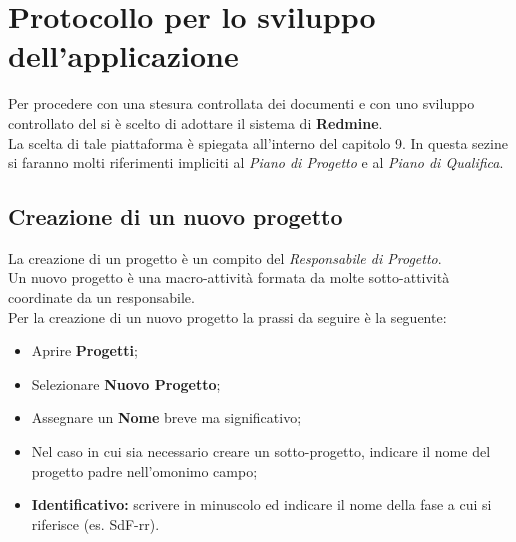 \section{Protocollo per lo sviluppo dell’applicazione}
  Per procedere con una stesura controllata dei documenti e con uno sviluppo controllato del  si è scelto di adottare
  il sistema di  \textbf{Redmine}.\\
  La scelta di tale piattaforma è spiegata all'interno del capitolo 9.
  In questa sezine si faranno molti riferimenti impliciti al \emph{Piano di Progetto} e al \emph{Piano di  Qualifica}.
  \subsection{Creazione di un nuovo progetto}
    La creazione di un progetto è un compito del \emph{Responsabile di Progetto}.\\
    Un nuovo progetto è una macro-attività formata da molte sotto-attività coordinate da un responsabile.\\
    Per la creazione di un nuovo progetto la prassi da seguire è la seguente:
    \begin{itemize}
      \item Aprire \textbf{Progetti};
      \item Selezionare \textbf{Nuovo Progetto};
      \item Assegnare un \textbf{Nome} breve ma significativo;
      \item Nel caso in cui sia necessario creare un sotto-progetto, indicare il nome del progetto padre nell'omonimo campo;
      \item \textbf{Identificativo: }scrivere in minuscolo ed indicare il nome della fase a cui si riferisce (es. SdF-rr).
    \end{itemize}
